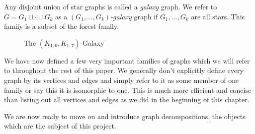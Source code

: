 \begin{definition}
    Any disjoint union of star graphs is called a \textit{galaxy} graph. We refer to $G=G_{1}\sqcup \cdot \sqcup G_{k}$ as a \textit{$(G_{1},\hdots,G_{k})$-galaxy} graph if $G_{1},\hdots,G_{k}$ are all stars. This family is a subset of the forest family.
\end{definition}

\begin{figure}[H]
    \begin{center}
    \end{center}
    \caption{The $(K_{1,6},K_{1,7})$-Galaxy}
    \label{fig:galaxy_close}
    \end{figure}
    
We have now defined a few very important families of graphs which we will refer to throughout the rest of this paper. We generally don't explicitly define every graph by its vertices and edges and simply refer to it as some member of one family or say this it is isomorphic to one. This is much more efficient and concise than listing out all vertices and edges as we did in the beginning of this chapter.

We are now ready to move on and introduce graph decompositions, the objects which are the subject of this project.
  














